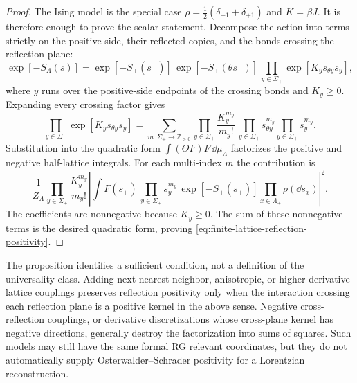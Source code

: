 \begin{proof}
The Ising model is the special case
\(\rho=\frac12(\delta_{-1}+\delta_{+1})\) and \(K=\beta J\).  It is therefore
enough to prove the scalar statement.  Decompose the action into terms
strictly on the positive side, their reflected copies, and the bonds crossing
the reflection plane:
\[
  \exp[-S_\Lambda(s)]
  =
  \exp[-S_+(s_+)]\,
  \exp[-S_+(\theta s_-)]\,
  \prod_{y\in\Sigma_+}\exp\!\left[K_y s_{\theta y}s_y\right],
\]
where \(y\) runs over the positive-side endpoints of the crossing bonds and
\(K_y\geq0\).  Expanding every crossing factor gives
\[
  \prod_{y\in\Sigma_+}\exp[K_y s_{\theta y}s_y]
  =
  \sum_{m:\Sigma_+\to\mathbb Z_{\geq0}}
  \prod_{y\in\Sigma_+}\frac{K_y^{m_y}}{m_y!}\,
  \prod_{y\in\Sigma_+}s_{\theta y}^{m_y}
  \prod_{y\in\Sigma_+}s_y^{m_y}.
\]
Substitution into the quadratic form
\(\int(\Theta F)F\,\dd\mu_\Lambda\) factorizes the positive and negative
half-lattice integrals.  For each multi-index \(m\) the contribution is
\[
  \frac{1}{Z_\Lambda}
  \prod_{y\in\Sigma_+}\frac{K_y^{m_y}}{m_y!}
  \left|
    \int
    F(s_+)\,
    \prod_{y\in\Sigma_+}s_y^{m_y}\,
    \exp[-S_+(s_+)]
    \prod_{x\in\Lambda_+}\rho(\dd s_x)
  \right|^2 .
\]
The coefficients are nonnegative because \(K_y\geq0\).  The sum of these
nonnegative terms is the desired quadratic form, proving
\eqref{eq:finite-lattice-reflection-positivity}.
\end{proof}

The proposition identifies a sufficient condition, not a definition of the
universality class.  Adding next-nearest-neighbor, anisotropic, or
higher-derivative lattice couplings preserves reflection positivity only when
the interaction crossing each reflection plane is a positive kernel in the
above sense.  Negative cross-reflection couplings, or derivative
discretizations whose cross-plane kernel has negative directions, generally
destroy the factorization into sums of squares.  Such models may still have
the same formal RG relevant coordinates, but they do not automatically supply
Osterwalder--Schrader positivity for a Lorentzian reconstruction.

